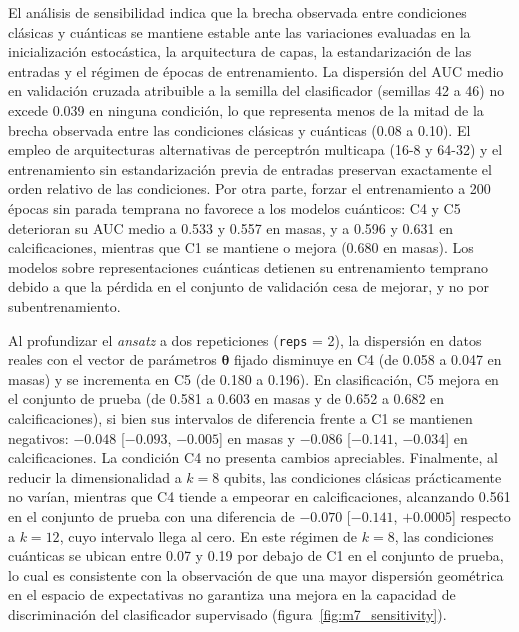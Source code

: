 El análisis de sensibilidad indica que la brecha observada entre condiciones clásicas y cuánticas se mantiene estable ante las variaciones evaluadas en la inicialización estocástica, la arquitectura de capas, la estandarización de las entradas y el régimen de épocas de entrenamiento. La dispersión del AUC medio en validación cruzada atribuible a la semilla del clasificador (semillas 42 a 46) no excede 0.039 en ninguna condición, lo que representa menos de la mitad de la brecha observada entre las condiciones clásicas y cuánticas (0.08 a 0.10). El empleo de arquitecturas alternativas de perceptrón multicapa (16-8 y 64-32) y el entrenamiento sin estandarización previa de entradas preservan exactamente el orden relativo de las condiciones. Por otra parte, forzar el entrenamiento a 200 épocas sin parada temprana no favorece a los modelos cuánticos: C4 y C5 deterioran su AUC medio a 0.533 y 0.557 en masas, y a 0.596 y 0.631 en calcificaciones, mientras que C1 se mantiene o mejora (0.680 en masas). Los modelos sobre representaciones cuánticas detienen su entrenamiento temprano debido a que la pérdida en el conjunto de validación cesa de mejorar, y no por subentrenamiento.

Al profundizar el \textit{ansatz} a dos repeticiones (\texttt{reps} = 2), la dispersión en datos reales con el vector de parámetros $\boldsymbol\theta$ fijado disminuye en C4 (de 0.058 a 0.047 en masas) y se incrementa en C5 (de 0.180 a 0.196). En clasificación, C5 mejora en el conjunto de prueba (de 0.581 a 0.603 en masas y de 0.652 a 0.682 en calcificaciones), si bien sus intervalos de diferencia frente a C1 se mantienen negativos: $-0.048$ [$-0.093$, $-0.005$] en masas y $-0.086$ [$-0.141$, $-0.034$] en calcificaciones. La condición C4 no presenta cambios apreciables. Finalmente, al reducir la dimensionalidad a $k = 8$ qubits, las condiciones clásicas prácticamente no varían, mientras que C4 tiende a empeorar en calcificaciones, alcanzando 0.561 en el conjunto de prueba con una diferencia de $-0.070$ [$-0.141$, $+0.0005$] respecto a $k = 12$, cuyo intervalo llega al cero. En este régimen de $k = 8$, las condiciones cuánticas se ubican entre 0.07 y 0.19 por debajo de C1 en el conjunto de prueba, lo cual es consistente con la observación de que una mayor dispersión geométrica en el espacio de expectativas no garantiza una mejora en la capacidad de discriminación del clasificador supervisado (figura~\ref{fig:m7_sensitivity}).

